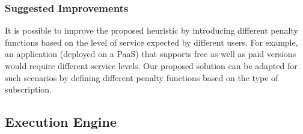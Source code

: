 \subsubsection{Suggested Improvements}
It is possible to improve the proposed heuristic by introducing different penalty functions  based on the level of service expected by different users. For example, an application (deployed on a PaaS) that supports free as well as paid versions would require different service levels. Our proposed solution can be adapted for such scenarios by defining different penalty functions based on the type of subscription.

\subsection{Execution Engine}